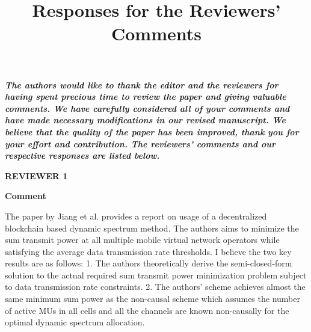 \documentclass[12pt,draftcls, onecolumn]{IEEEtran}
\begin{document}
\title{Responses for the Reviewers' Comments}
\maketitle \vspace{-15mm}


\textbf{\textcolor[rgb]{0.00,0.00,1.00}{\emph{The authors would like
to thank the editor and the reviewers for having spent precious time
to review the paper and giving valuable comments. We have carefully
considered all of your comments and have made necessary
modifications in our revised manuscript. We believe that the quality
of the paper has been improved, thank you for your effort and
contribution. The reviewers' comments and our respective responses
are listed below.}}}

\begin{comment}
\vspace{5mm} \noindent\textcolor[rgb]{1.00,0.00,0.00}{\textbf{EDITOR}}

\vspace{3mm} \noindent\textcolor[rgb]{1.00,0.00,0.00}{\textbf{Comment}}
\vspace{3mm}

The major concern is that it's not well justified why Blockchain is the right technology for the proposed dynamic spectrum acquisition given the slow speed of PoW, small number of MVNOs, and potential security vulnerabilities. Furthermore, the proposed method is not compared with conventional ones. So its advantage is not clearly demonstrated.

\vspace{3mm} \noindent\textcolor[rgb]{0.00,0.00,1.00}{\textbf{Response}}
\vspace{2mm}

We thank the editor for the valuable comments.
\newpage
\end{comment}


\vspace{5mm} \noindent\textcolor[rgb]{1.00,0.00,0.00}{\textbf{REVIEWER
1}}

\vspace{3mm} \noindent\textcolor[rgb]{1.00,0.00,0.00}{\textbf{Comment}}
\vspace{3mm}

The paper by Jiang et al. provides a report on usage of a decentralized blockchain based dynamic spectrum method. The authors aims to minimize the sum transmit power at all multiple mobile virtual network operators while satisfying the average data transmission rate thresholds. I believe the two key results are as follows: 1. The authors theoretically derive the semi-closed-form solution to the actual required sum transmit power minimization problem subject to data transmission rate constraints. 2. The authors' scheme achieves almost the same minimum sum power as the non-causal scheme which assumes the number of active MUs in all cells and all the channels are known non-causally for the optimal dynamic spectrum allocation.
\end{document}
